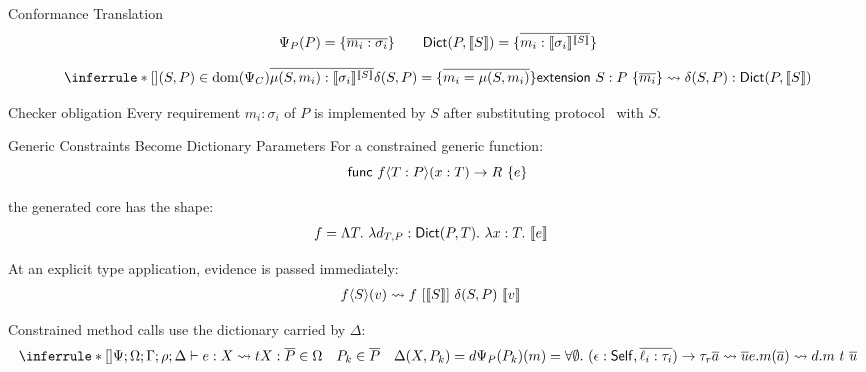 \begin{frame}{Conformance Translation}
\[
\Psi_P(P)=\{\overline{m_i:\sigma_i}\}
\qquad
\Dict(P,\trans{S})
=
\{\overline{m_i:\transSelf{\trans{S}}{\sigma_i}}\}
\]

\vspace{1mm}
\[
\inferrule*[]
  {
    (S,P)\in\dom(\Psi_C)
    \\
    \overline{
      \mu(S,m_i):
      \transSelf{\trans{S}}{\sigma_i}}
    \\
    \delta(S,P)
    =
    \{\overline{m_i=\mu(S,m_i)}\}
  }
  {
    \kw{extension}\ S:P\ \{\overline{m_i}\}
    \elab
    \delta(S,P):\Dict(P,\trans{S})
  }
\]

\vspace{1mm}
\begin{block}{Checker obligation}
Every requirement $m_i:\sigma_i$ of $P$ is implemented by $S$ after
substituting protocol \Self\ with $S$.
\end{block}
\end{frame}

\begin{frame}{Generic Constraints Become Dictionary Parameters}
\small
For a constrained generic function:
\[
\kw{func}\ f\langle T:P\rangle(x:T)\to R\ \{e\}
\]

the generated core has the shape:
\[
\begin{aligned}
f
&=
\Lambda T.\
\lambda d_{T,P}:\Dict(P,T).\
\lambda x:T.\ \trans{e}
\end{aligned}
\]

\vspace{1mm}
At an explicit type application, evidence is passed immediately:
\[
\begin{aligned}
f\langle S\rangle(v)
&\elab
f\ [\trans{S}]\ \delta(S,P)\ \trans{v}
\end{aligned}
\]

\vspace{-1mm}
Constrained method calls use the dictionary carried by $\Delta$:
\[
\inferrule*[]
  {
    \Psi;\Omega;\Gamma;\rho;\Delta \vdash e:X \elab t
    \\
    X:\overline{P}\in\Omega
    \quad
    P_k\in\overline{P}
    \quad
    \Delta(X,P_k)=d
    \\
    \Psi_P(P_k)(m)=
      \ftype{\emptyctx}{\epsilon:\Self,\overline{\ell_i:\tau_i}}{\tau_r}
    \\
    \overline{a}\elab\overline{u}
  }
  {
    e.m(\overline{a})
    \elab
    d.m\ t\ \overline{u}
  }
\]
\end{frame}

